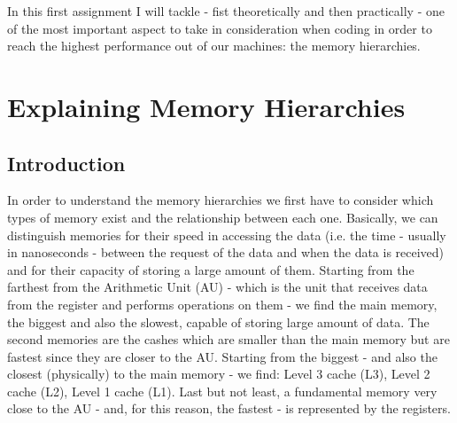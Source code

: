 \documentclass[unicode,11pt,a4paper,oneside,numbers=endperiod,openany]{scrartcl}
\begin{document}
\setassignment
{}

\newline

\assignmentpolicy
In this first assignment I will tackle - fist theoretically and then practically - one of the most important aspect to take in consideration when coding in order to reach the highest performance out of our machines: the memory hierarchies. 

\section{Explaining Memory Hierarchies }
\subsection{Introduction}
In order to understand the memory hierarchies we first have to consider which types of memory exist and the relationship between each one. Basically, we can distinguish memories for their speed in accessing the data (i.e. the time - usually in nanoseconds - between the request of the data and when the data is received) and for their capacity of storing a large amount of them. Starting from the farthest from the Arithmetic Unit (AU) - which is the unit that receives data from the register and performs operations on them - we find the main memory, the biggest and also the slowest, capable of storing large amount of data. The second memories are the cashes which are smaller than the main memory but are fastest since they are closer to the AU. Starting from the biggest - and also the closest (physically) to the main memory - we find: Level 3 cache (L3), Level 2 cache (L2), Level 1 cache (L1). Last but not least, a fundamental memory very close to the AU - and, for this reason, the fastest - is represented by the registers.
\end{document}
